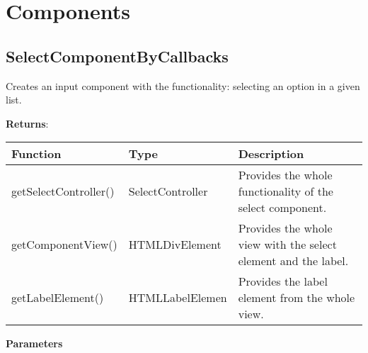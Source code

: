\clearpage
\section*{Components}

\vspace*{6pt}
\subsection*{SelectComponentByCallbacks}

\vspace*{6pt}
Creates an input component with the functionality: selecting an option in a given list. 

\vspace*{18pt}
\noindent
\textbf{Returns}: 

\begin{table}[!htb] 
    \label{api:selectComponentByCallbacksReturn}
    \footnotesize
    \setlength\extrarowheight{4pt}
    \begin{tabular}{ p{3.5cm} p{3.5cm} p{6cm} }
        \toprule[1.2pt]
        \textbf{Function}     & \textbf{Type}        & \textbf{Description} \\
        \midrule
        getSelectController() & SelectController & Provides the whole functionality of the select component. \\
        getComponentView()    & HTMLDivElement   & Provides the whole view with the select element and the label. \\
        getLabelElement()     & HTMLLabelElemen  & Provides the label element from the whole view. \\
        \bottomrule[1.2pt]
    \end{tabular}
\end{table}

\vspace*{6pt}
\noindent
\textbf{Parameters}

